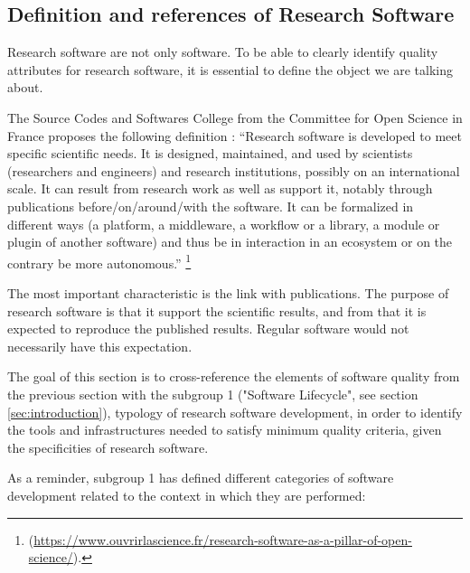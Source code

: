 \subsection{Definition and references of Research Software}

Research software are not only software. To be able to clearly
identify quality attributes for research software, it is essential to
define the object we are talking about.

The Source Codes and Softwares College from the Committee for Open
Science in France proposes the following definition : 
``Research software is developed to meet specific scientific needs. It
is designed, maintained, and used by scientists (researchers and
engineers) and research institutions, possibly on an international
scale. It can result from research work as well as support it, notably
through publications before/on/around/with the software. It can be
formalized in different ways (a platform, a middleware, a workflow or
a library, a module or plugin of another software) and thus be in
interaction in an ecosystem or on the contrary be more
autonomous.'' \footnote{(\url{https://www.ouvrirlascience.fr/research-software-as-a-pillar-of-open-science/}).}

The most important characteristic is the link with publications. The
purpose of research software is that it support the scientific
results, and from that it is expected to reproduce the published
results. Regular software would not necessarily have this expectation.

The goal of this section is to cross-reference the elements of
software quality from the previous section with the subgroup 1
\cite{sg1tf2023} ("Software Lifecycle", see section
\ref{sec:introduction}), typology of research software development, in
order to identify the tools and infrastructures needed to satisfy
minimum quality criteria, given the specificities of research software.  

As a reminder, subgroup 1 has defined different categories of software
development related to the context in which they are performed:

